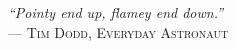 {\sffamily\itshape
``Pointy end up,
flamey end down.''\\}
--- \textsc{Tim Dodd, Everyday Astronaut}
